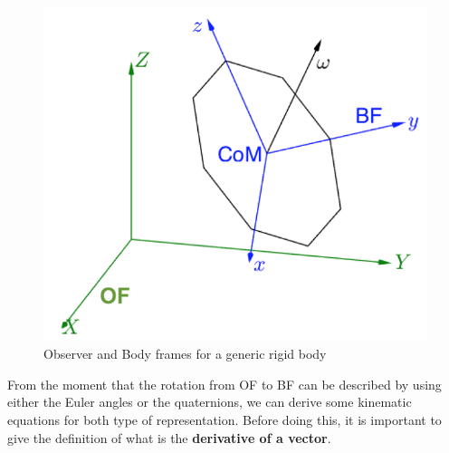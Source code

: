 \begin{figure}[h]
    \centering
    \includegraphics[scale=0.7]{AerospaceApplications/images/OF_BF.png}
    \caption{ \textsf{Observer and Body frames for a generic rigid body}} 
\end{figure}

From the moment that the rotation from \textsf{OF} to \textsf{BF} can be described by using either the Euler angles or the quaternions, we can derive some kinematic equations for both type of representation. Before doing this, it is important to give the definition of what is the \textbf{derivative of a vector}.

